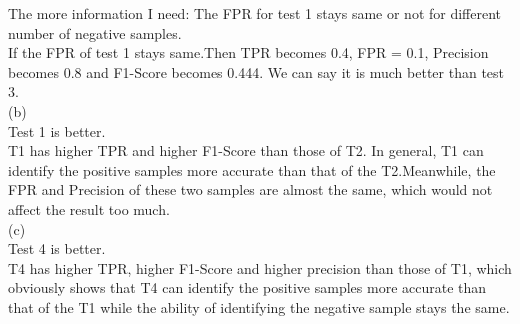 \documentclass[12pt]{article}
\begin{document}
The more information I need: The FPR for test 1 stays same or not for different number of negative samples.\\

If the FPR of test 1 stays same.Then TPR becomes 0.4, FPR = 0.1, Precision becomes 0.8 and F1-Score becomes 0.444. We can say it is much better than test 3.\\

(b)\\

Test 1 is better.\\

T1 has higher TPR and higher F1-Score than those of T2. In general, T1 can identify the positive samples more accurate than that of the T2.Meanwhile, the FPR and Precision of these two samples are almost the same, which would not affect the result too much.\\

(c)\\

Test 4 is better.\\

T4 has higher TPR, higher F1-Score and higher precision than those of T1, which obviously shows that T4 can identify the positive samples more accurate than that of the T1 while the ability of identifying the negative sample stays the same.\\
\end{document}
